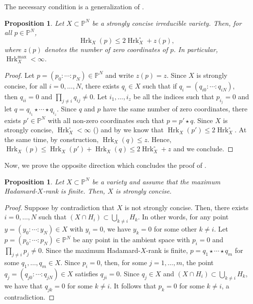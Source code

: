 \documentclass{amsart}
\theoremstyle{plain}
\numberwithin{theorem}{section}
\newtheorem{proposition}[theorem]{Proposition}
\theoremstyle{definition}
\newcommand{\bbP}{\mathbb{P}}
\newcommand{\Hrk}{\operatorname{Hrk}}
\begin{document}
The necessary condition is a generalization of .
\begin{proposition}
\label{prop:bound_zeroes}
    Let $X \subset \bbP^N$ be a strongly concise irreducible variety. Then, for all $p \in \bbP^N$, 
    \[
        \Hrk_X(p) \leq 2\Hrk_X^\circ + z(p),
    \]
    where $z(p)$ denotes the number of zero coordinates of $p$. In particular, $\Hrk_X^{\max}<\infty$.
\end{proposition}
\begin{proof}
    Let $p = (p_0 : \cdots :p_N) \in \bbP^N$ and write $z(p) = z$. Since $X$ is strongly concise, for all $i = 0,\ldots, N$, there exists $q_i \in X$ such that if $q_i = (q_{i0}:\cdots:q_{iN})$, then $q_{ii}= 0$ and $\prod_{j \neq i} q_{ij} \neq 0$. Let $i_1,\ldots,i_z$ be all the indices such that $p_{i_j} = 0$ and let $q = q_{i_1}\star \cdots \star q_{i_z}$. Since $q$ and $p$ have the same number of zero coordinates, there exists $p' \in \bbP^N$ with all non-zero coordinates such that $p = p' \star q$. Since $X$ is strongly concise, $\Hrk_X^\circ <\infty$ () and by  we know that $\Hrk_X(p') \leq 2 \Hrk_X^\circ$. At the same time, by construction, $\Hrk_X(q) \leq z$. Hence, $\Hrk_X(p) \leq \Hrk_X(p') + \Hrk_X(q) \leq 2 \Hrk_X^\circ + z$ and we conclude. 
\end{proof}

Now, we prove the opposite direction which concludes the proof of .

\begin{proposition}\label{prop:maximum=>strongly_concise}
    Let $X \subset \bbP^N$ be a variety and assume that the maximum Hadamard-$X$-rank is finite. Then, $X$ is strongly concise.
\end{proposition}
\begin{proof}
    Suppose by contradiction that $X$ is not strongly concise. Then, there exists $i = 0,\ldots, N$ such that $(X \cap H_i) \subset \bigcup_{k\neq i} H_k$. In other words, for any point $y = (y_0 : \cdots :y_N) \in X$ with $y_i = 0$, we have $y_k = 0$ for some other $k \neq i$. Let $p = (p_0 : \cdots : p_N) \in \bbP^N$ be any point in the ambient space with $p_i = 0$ and $\prod_{j \neq i} p_j \neq 0$. Since the maximum Hadamard-$X$-rank is finite, $p = q_1\star \cdots \star q_m$ for some $q_1,\ldots,q_m \in X$. Since $p_i = 0$, then, for some $j = 1,\ldots, m$, the point $q_j = (q_{j0}: \cdots :q_{jN}) \in X$ satisfies $q_{ji} = 0$. Since $q_j \in X$ and $(X\cap H_i) \subset \bigcup_{k \neq i} H_k$, we have that $q_{jk} = 0$ for some $k \neq i$. It follows that $p_k = 0$ for some $k \neq i$, a contradiction.  
\end{proof}
\end{document}

